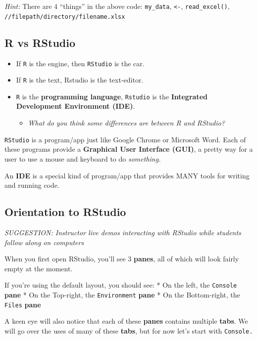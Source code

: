 \documentclass[
]{book}
\providecommand{\tightlist}{%
  \setlength{\itemsep}{0pt}\setlength{\parskip}{0pt}}
\begin{document}
\emph{Hint:} There are 4 ``things'' in the above code:
\texttt{my\_data},
\texttt{\textless{}-},
\texttt{read\_excel()},
\texttt{//filepath/directory/filename.xlsx}

\hypertarget{r-vs-rstudio}{%
\subsection{R vs RStudio}\label{r-vs-rstudio}}

\begin{itemize}
\item
  If \texttt{R} is the engine, then \texttt{RStudio} is the car.
\item
  If \texttt{R} is the text, Rstudio is the text-editor.
\item
  \texttt{R} is the \textbf{programming language}, \texttt{Rstudio} is the \textbf{Integrated Development Environment (IDE)}.

  \begin{itemize}
  \tightlist
  \item
    \emph{What do you think some differences are between R and RStudio?}
  \end{itemize}
\end{itemize}

\texttt{RStudio} is a program/app just like Google Chrome or Microsoft Word. Each
of these programs provide a \textbf{Graphical User Interface (GUI)}, a pretty way for
a user to use a mouse and keyboard to do \emph{something.}

An \textbf{IDE} is a special kind of program/app that provides MANY tools for writing and running code.

\hypertarget{orientation-to-rstudio}{%
\subsection{Orientation to RStudio}\label{orientation-to-rstudio}}

\emph{SUGGESTION: Instructor live demos interacting with RStudio while students follow along on computers}

When you first open RStudio, you'll see 3 \textbf{panes}, all of which will look fairly empty at the moment.

If you're using the default layout, you should see:
* On the left, the \texttt{Console} \textbf{pane}
* On the Top-right, the \texttt{Environment} \textbf{pane}
* On the Bottom-right, the \texttt{Files} \textbf{pane}

A keen eye will also notice that each of these \textbf{panes} contains multiple \textbf{tabs}. We will go over the uses of many of these \textbf{tabs}, but for now let's start with \texttt{Console.}
\end{document}
